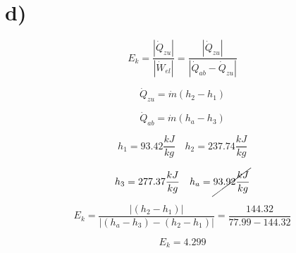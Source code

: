 

\section*{d)}
\begin{equation*}
    E_k = \frac{| \dot{Q}_{zu} |}{| \dot{W}_{el} |} = \frac{| \dot{Q}_{zu} |}{| \dot{Q}_{ab} - \dot{Q}_{zu} |}
\end{equation*}

\begin{equation*}
    \dot{Q}_{zu} = \dot{m} (h_2 - h_1)
\end{equation*}

\begin{equation*}
    \dot{Q}_{ab} = \dot{m} (h_a - h_3)
\end{equation*}

\begin{equation*}
    h_1 = 93.42 \frac{kJ}{kg} \quad h_2 = 237.74 \frac{kJ}{kg}
\end{equation*}

\begin{equation*}
    h_3 = 277.37 \frac{kJ}{kg} \quad h_a = \cancel{93.92 \frac{kJ}{kg}}
\end{equation*}

\begin{equation*}
    E_k = \frac{| (h_2 - h_1) |}{| (h_a - h_3) - (h_2 - h_1) |} = \frac{144.32}{77.99 - 144.32}
\end{equation*}

\begin{equation*}
    \boxed{E_k = 4.299}
\end{equation*}